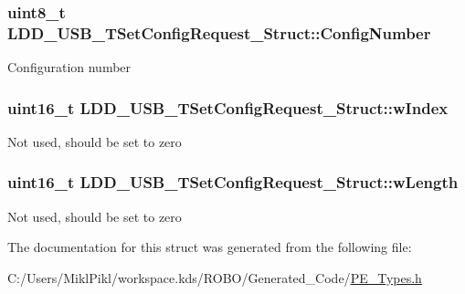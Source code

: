 \subsubsection[{Config\+Number}]{\setlength{\rightskip}{0pt plus 5cm}uint8\+\_\+t L\+D\+D\+\_\+\+U\+S\+B\+\_\+\+T\+Set\+Config\+Request\+\_\+\+Struct\+::\+Config\+Number}\label{struct_l_d_d___u_s_b___t_set_config_request___struct_a9a545d7858a7ee85dbe37eaf2b4b7e01}
Configuration number \hypertarget{struct_l_d_d___u_s_b___t_set_config_request___struct_ad2aa2851b128777e842b2ac796d2f664}{}
\subsubsection[{w\+Index}]{\setlength{\rightskip}{0pt plus 5cm}uint16\+\_\+t L\+D\+D\+\_\+\+U\+S\+B\+\_\+\+T\+Set\+Config\+Request\+\_\+\+Struct\+::w\+Index}\label{struct_l_d_d___u_s_b___t_set_config_request___struct_ad2aa2851b128777e842b2ac796d2f664}
Not used, should be set to zero \hypertarget{struct_l_d_d___u_s_b___t_set_config_request___struct_a66312977eb5816459d0201a2bacaf9b5}{}
\subsubsection[{w\+Length}]{\setlength{\rightskip}{0pt plus 5cm}uint16\+\_\+t L\+D\+D\+\_\+\+U\+S\+B\+\_\+\+T\+Set\+Config\+Request\+\_\+\+Struct\+::w\+Length}\label{struct_l_d_d___u_s_b___t_set_config_request___struct_a66312977eb5816459d0201a2bacaf9b5}
Not used, should be set to zero 

The documentation for this struct was generated from the following file\+:\begin{DoxyCompactItemize}
\item 
C\+:/\+Users/\+Mikl\+Pikl/workspace.\+kds/\+R\+O\+B\+O/\+Generated\+\_\+\+Code/\hyperlink{_p_e___types_8h}{P\+E\+\_\+\+Types.\+h}\end{DoxyCompactItemize}
